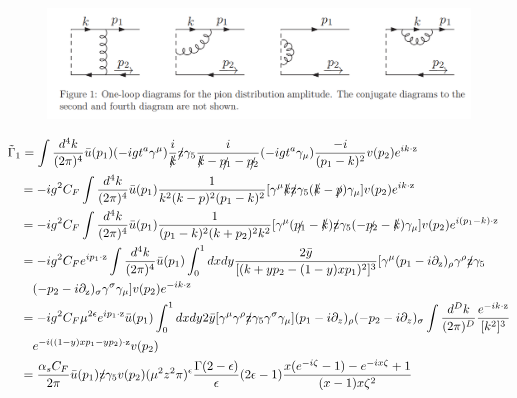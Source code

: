 \documentclass{article}
\begin{document}
\begin{figure}
 	\centering
 	\includegraphics[scale=0.7]{fig1.png} 	
\end{figure} 

   
\begin{align}{}
	&\tilde{\Gamma}_1 =\int \frac{d^4 k}{(2\pi)^4}\bar{u}(p_1)(-i g t^a \gamma^\mu) \frac{i}{\slashed{k}} \slashed{\text{z}} \gamma_5 \frac{i}{\slashed{k}-\slashed{p_1}-\slashed{p_2}} (-i g t^a \gamma_\mu) \frac{-i}{(p_1-k)^2} v(p_2) e^{ik\cdot \text{z}}\notag\\		
	&\quad=-i g^2 C_F  \int \frac{d^4 k}{(2\pi)^4}\bar{u}(p_1) \frac{1}{k^2 (k-p)^2 (p_1-k)^2}[\gamma^\mu \slashed{k} \slashed{\text{z}} \gamma_5 (\slashed{k}-\slashed{p})\gamma_\mu] v(p_2) e^{ik\cdot \text{z}} \notag\\
	&\quad=-i g^2 C_F \int \frac{d^4 k}{(2\pi)^4}\bar{u}(p_1) \frac{1}{(p_1-k)^2 (k+p_2)^2 k^2}[\gamma^\mu (\slashed{p_1}-\slashed{k}) \slashed{\text{z}} \gamma_5 (-\slashed{p_2}-\slashed{k})\gamma_\mu] v(p_2) e^{i(p_1-k)\cdot \text{z}}\notag\\
	&\quad= -i g^2 C_F  e^{ip_1\cdot \text{z}} \int \frac{d^4 k}{(2\pi)^4}\bar{u}(p_1) \int_{0}^{1} dx dy \frac{2 \bar{y}}{[(k+yp_2-(1-y)xp_1)^2]^3}[\gamma^\mu (p_1-i\partial_\text{z})_\rho \gamma^\rho \slashed{\text{z}} \gamma_5\notag\\
	& \qquad (-p_2-i\partial_\text{z})_\sigma \gamma^\sigma \gamma_\mu] v(p_2) e^{-i k \cdot \text{z}}\notag\\
	&\quad= -i g^2 C_F  \mu^{2\epsilon} e^{ip_1\cdot \text{z}} \bar{u}(p_1) \int_{0}^{1} dx dy 2\bar{y} [\gamma^\mu \gamma^\rho \slashed{\text{z}} \gamma_5 \gamma^\sigma \gamma_\mu] (p_1-i\partial_z)_\rho (-p_2-i\partial_z)_\sigma \int \frac{d^D k}{(2\pi)^D} \frac{e^{-i k \cdot \text{z}}}{[k^2]^3}\notag\\ 
	&\qquad e^{-i((1-y)xp_1-yp_2)\cdot \text{z}}  v(p_2) \notag\\
   &\quad= \frac{\alpha_s C_F}{2\pi} \bar{u}(p_1) \slashed{\text{z}} \gamma_5 v(p_2) (\mu^2z^2\pi)^\epsilon \frac{\Gamma(2-\epsilon)}{\epsilon} (2\epsilon-1) \frac{x(e^{-i\zeta}-1)-e^{-ix\zeta}+1}{(x-1)x\zeta^2} \notag\\
\end{align}
\end{document}
